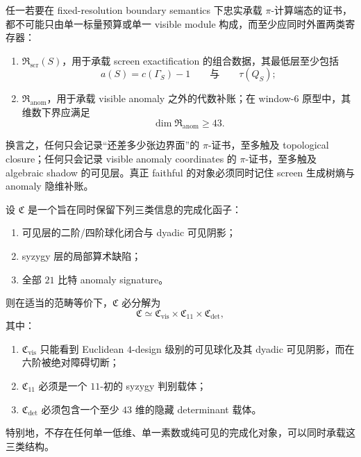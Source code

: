 \begin{conjecture}\label{conj:conclusion-window6-screen-faithful-pi-certificate-two-register-lower-bound}
任一若要在 fixed-resolution boundary semantics 下忠实承载 \(\pi\)-计算端态的证书，都不可能只由单一标量预算或单一 visible module 构成，而至少应同时外置两类寄存器：
\begin{enumerate}
  \item \(\mathfrak R_{\mathrm{scr}}(S)\)，用于承载 screen exactification 的组合数据，其最低层至少包括
        \[
        a(S)=c(\Gamma_S)-1
        \qquad\text{与}\qquad
        \tau(Q_S);
        \]
  \item \(\mathfrak R_{\mathrm{anom}}\)，用于承载 visible anomaly 之外的代数补账；在 window-\(6\) 原型中，其维数下界应满足
        \[
        \dim \mathfrak R_{\mathrm{anom}}\ge 43.
        \]
\end{enumerate}
换言之，任何只会记录“还差多少张边界面”的 \(\pi\)-证书，至多触及 topological closure；任何只会记录 visible anomaly coordinates 的 \(\pi\)-证书，至多触及 algebraic shadow 的可见层。真正 faithful 的对象必须同时记住 screen 生成树熵与 anomaly 隐维补账。
\end{conjecture}

\begin{conjecture}\label{conj:conclusion-window6-complete-completion-trisplitting}
设 \(\mathfrak C\) 是一个旨在同时保留下列三类信息的完成化函子：
\begin{enumerate}
  \item 可见层的二阶/四阶球化闭合与 dyadic 可见阴影；
  \item syzygy 层的局部算术缺陷；
  \item 全部 \(21\) 比特 anomaly signature。
\end{enumerate}
则在适当的范畴等价下，\(\mathfrak C\) 必分解为
\[
\mathfrak C
\simeq
\mathfrak C_{\mathrm{vis}}
\times
\mathfrak C_{11}
\times
\mathfrak C_{\det},
\]
其中：
\begin{enumerate}
  \item \(\mathfrak C_{\mathrm{vis}}\) 只能看到 Euclidean \(4\)-design 级别的可见球化及其 dyadic 可见阴影，而在六阶被绝对障碍切断；
  \item \(\mathfrak C_{11}\) 必须是一个 \(11\)-初的 syzygy 判别载体；
  \item \(\mathfrak C_{\det}\) 必须包含一个至少 \(43\) 维的隐藏 determinant 载体。
\end{enumerate}
特别地，不存在任何单一低维、单一素数或纯可见的完成化对象，可以同时承载这三类结构。
\end{conjecture}

